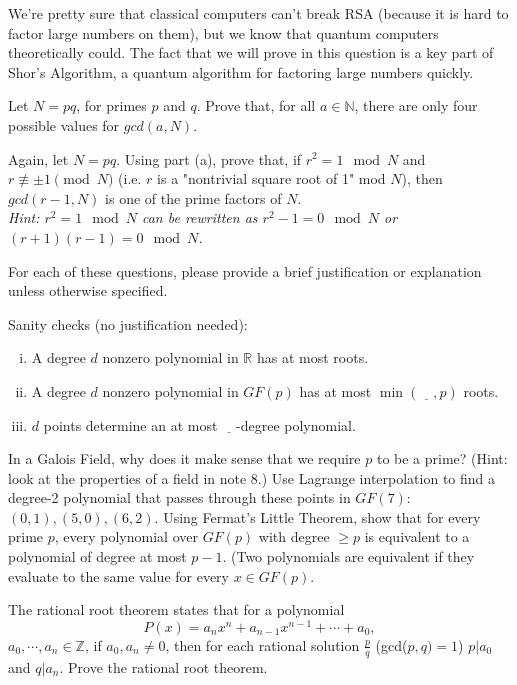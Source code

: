 
We're pretty sure that classical computers can't break RSA (because it is hard to factor large numbers on them), but we know that quantum computers theoretically could. The fact that we will prove in this question is a key part of Shor's Algorithm, a quantum algorithm for factoring large numbers quickly.

\begin{Parts}
\Part
Let $N = pq$, for primes $p$ and $q$. Prove that, for all $a \in \mathbb{N}$, there are only four possible values for $gcd(a, N)$.

\Part 
Again, let $N=pq$. Using part (a), prove that, if $r^2 = 1 \mod N$ and $r \not \equiv \pm 1 \pmod N$ (i.e. $r$ is a "nontrivial square root of 1" mod $N$), then $gcd(r-1, N)$ is one of the prime factors of $N$.\\
\textit{Hint: $r^2 = 1 \mod N$ can be rewritten as $r^2 - 1 = 0 \mod N$ or $(r+1)(r-1) = 0 \mod N$.}

\end{Parts}

For each of these questions, please provide a brief justification or explanation unless otherwise specified.
\begin{Parts}
	\Part Sanity checks (no justification needed): 
	\begin{enumerate}[(i)]
		\item A degree $d$ nonzero polynomial in $\mathbb{R}$ has at most \underline{\quad} roots.
		\item A degree $d$ nonzero polynomial in $GF(p)$ has at most $\min(\underline{\quad}, p)$ roots. 
		\item $d$ points determine an at most $\underline{\quad}$-degree polynomial. 
	\end{enumerate}
	\Part In a Galois Field, why does it make sense that we require $p$ to be a prime? (Hint: look at the properties of a field in note 8.)
	\Part Use Lagrange interpolation to find a degree-2 polynomial that passes through these points in $GF(7)$:	$(0,1), (5,0), (6, 2)$. 
	\Part Using Fermat's Little Theorem, show that for every prime $p$, every polynomial over $GF(p)$ with degree $\geq p$ is equivalent to a polynomial of degree at most $p-1$. (Two polynomials are equivalent if they evaluate to the same value for every $x\in GF(p)$.
\end{Parts}

The rational root theorem states that for a polynomial
\[P(x) = a_nx^n + a_{n-1}x^{n-1} + \cdots + a_0,   \]
$a_0, \cdots, a_n \in \mathbb{Z}$, if $a_0, a_n \neq 0$, then for each rational solution $\frac{p}{q}$ (gcd($p,q) = 1$) $p | a_0$ and $q|a_n$. Prove the rational root theorem. 

